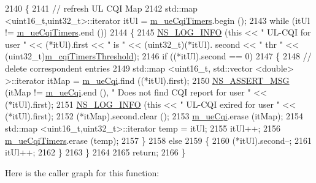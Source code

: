 \begin{DoxyCode}
2140 \{
2141   \textcolor{comment}{// refresh UL CQI  Map}
2142   std::map <uint16\_t,uint32\_t>::iterator itUl = \hyperlink{classns3_1_1TdTbfqFfMacScheduler_abc6132bce28b1ee650503bf3144eb22a}{m\_ueCqiTimers}.begin ();
2143   \textcolor{keywordflow}{while} (itUl != \hyperlink{classns3_1_1TdTbfqFfMacScheduler_abc6132bce28b1ee650503bf3144eb22a}{m\_ueCqiTimers}.end ())
2144     \{
2145       \hyperlink{group__logging_gafbd73ee2cf9f26b319f49086d8e860fb}{NS\_LOG\_INFO} (\textcolor{keyword}{this} << \textcolor{stringliteral}{" UL-CQI for user "} << (*itUl).first << \textcolor{stringliteral}{" is "} << (uint32\_t)(*itUl).
      second << \textcolor{stringliteral}{" thr "} << (uint32\_t)\hyperlink{classns3_1_1TdTbfqFfMacScheduler_a4a154b47a91bb301ab183ce57e44c431}{m\_cqiTimersThreshold});
2146       \textcolor{keywordflow}{if} ((*itUl).second == 0)
2147         \{
2148           \textcolor{comment}{// delete correspondent entries}
2149           std::map <uint16\_t, std::vector <double> >::iterator itMap = \hyperlink{classns3_1_1TdTbfqFfMacScheduler_a5cf85878fa75fd31bdc63527492e9270}{m\_ueCqi}.find ((*itUl).first);
2150           \hyperlink{assert_8h_aff5ece9066c74e681e74999856f08539}{NS\_ASSERT\_MSG} (itMap != \hyperlink{classns3_1_1TdTbfqFfMacScheduler_a5cf85878fa75fd31bdc63527492e9270}{m\_ueCqi}.end (), \textcolor{stringliteral}{" Does not find CQI report for user "}
       << (*itUl).first);
2151           \hyperlink{group__logging_gafbd73ee2cf9f26b319f49086d8e860fb}{NS\_LOG\_INFO} (\textcolor{keyword}{this} << \textcolor{stringliteral}{" UL-CQI exired for user "} << (*itUl).first);
2152           (*itMap).second.clear ();
2153           \hyperlink{classns3_1_1TdTbfqFfMacScheduler_a5cf85878fa75fd31bdc63527492e9270}{m\_ueCqi}.erase (itMap);
2154           std::map <uint16\_t,uint32\_t>::iterator temp = itUl;
2155           itUl++;
2156           \hyperlink{classns3_1_1TdTbfqFfMacScheduler_abc6132bce28b1ee650503bf3144eb22a}{m\_ueCqiTimers}.erase (temp);
2157         \}
2158       \textcolor{keywordflow}{else}
2159         \{
2160           (*itUl).second--;
2161           itUl++;
2162         \}
2163     \}
2164 
2165   \textcolor{keywordflow}{return};
2166 \}
\end{DoxyCode}


Here is the caller graph for this function\+:


